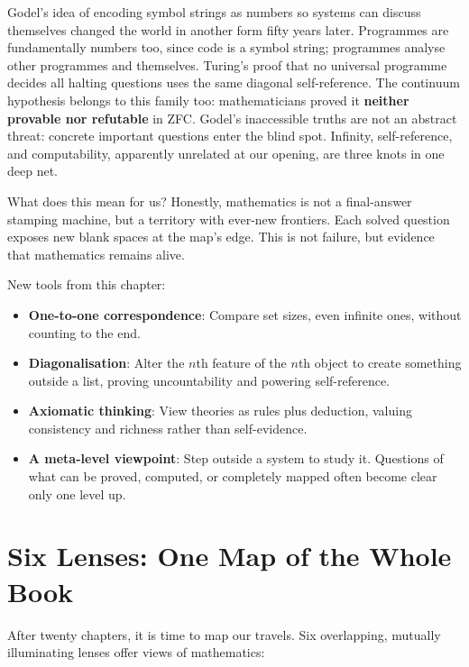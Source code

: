 \begin{lianjie}
Godel's idea of encoding symbol strings as numbers so systems can discuss themselves changed the world in another form fifty years later. Programmes are fundamentally numbers too, since code is a symbol string; programmes analyse other programmes and themselves. Turing's proof that no universal programme decides all halting questions uses the same diagonal self-reference. The continuum hypothesis belongs to this family too: mathematicians proved it \textbf{neither provable nor refutable} in ZFC. Godel's inaccessible truths are not an abstract threat: concrete important questions enter the blind spot. Infinity, self-reference, and computability, apparently unrelated at our opening, are three knots in one deep net.
\end{lianjie}

What does this mean for us? Honestly, mathematics is not a final-answer stamping machine, but a territory with ever-new frontiers. Each solved question exposes new blank spaces at the map's edge. This is not failure, but evidence that mathematics remains alive.

\begin{toolbox}
New tools from this chapter:
\begin{itemize}
\item \textbf{One-to-one correspondence}: Compare set sizes, even infinite ones, without counting to the end.
\item \textbf{Diagonalisation}: Alter the $n$th feature of the $n$th object to create something outside a list, proving uncountability and powering self-reference.
\item \textbf{Axiomatic thinking}: View theories as rules plus deduction, valuing consistency and richness rather than self-evidence.
\item \textbf{A meta-level viewpoint}: Step outside a system to study it. Questions of what can be proved, computed, or completely mapped often become clear only one level up.
\end{itemize}
\end{toolbox}

\section{Six Lenses: One Map of the Whole Book}

After twenty chapters, it is time to map our travels. Six overlapping, mutually illuminating lenses offer views of mathematics:

